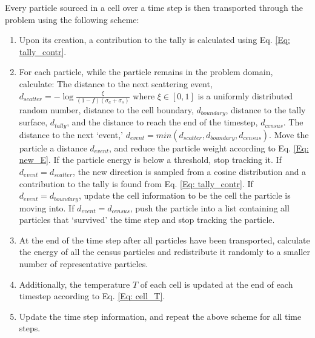 \documentclass[]{article}
\begin{document}
    Every particle sourced in a cell over a time step is then transported through the problem using the following scheme:
	\begin{enumerate}
		\item Upon its creation, a contribution to the tally is calculated using Eq. \ref{Eq: tally_contr}.
		\item For each particle, while the particle remains in the problem domain, calculate:
			\subitem The distance to the next scattering event, $d_{scatter} = -\log{\frac{\xi}{(1 - f)(\sigma_{a} + \sigma_{s})}}$ where $\xi \in [0,1]$ is a uniformly distributed random number, distance to the cell boundary, $d_{boundary}$, distance to the tally surface, $d_{tally}$, and the distance to reach the end of the timestep, $d_{census}$.
			\subitem The distance to the next `event,' $d_{event} = min(d_{scatter}, d_{boundary}, d_{census})$.
			\subitem Move the particle a distance $d_{event}$, and reduce the particle weight according to Eq. \ref{Eq: new_E}.
	     	\subitem If the particle energy is below a threshold, stop tracking it.
			\subitem If $d_{event} = d_{scatter}$, the new direction is sampled from a cosine distribution and a contribution to the tally is found from Eq. \ref{Eq: tally_contr}.
			\subitem If $d_{event} = d_{boundary}$, update the cell information to be the cell the particle is moving into.
			\subitem If $d_{event} = d_{census}$, push the particle into a list containing all particles that `survived' the time step and stop tracking the particle.
		\item At the end of the time step after all particles have been transported, calculate the energy of all the census particles and redistribute it randomly to a smaller number of representative particles.
		\item Additionally, the temperature $T$ of each cell is updated at the end of each timestep according to Eq. \ref{Eq: cell_T}.

		\item Update the time step information, and repeat the above scheme for all time steps.
	\end{enumerate}
\end{document}
